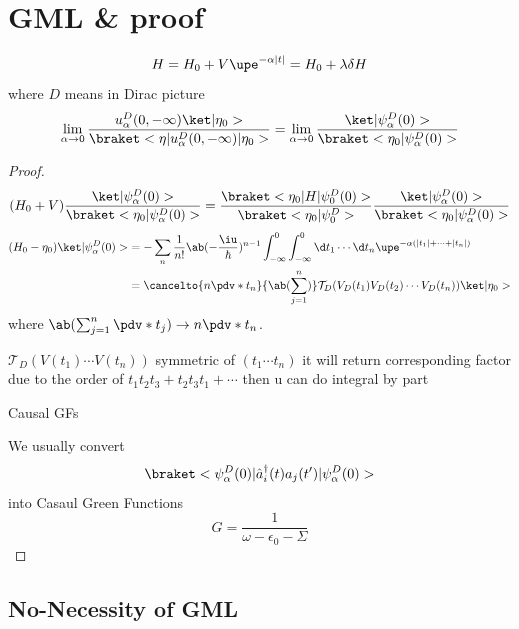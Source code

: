 \section{GML \& proof}

\[
  H = H_0 + V\upe^{-\alpha|t|} = H_0 + \lambda\delta H
\]
where $D$ means in Dirac picture
\[
  \lim_{\alpha\to0}
  \frac{u_\alpha^D(0,-\infty) \ket|\eta_0>}{\braket<\eta|u_\alpha^D(0,-\infty)|\eta_0>} = \lim_{\alpha\to0} \frac{\ket|\psi_\alpha^D(0)>}{\braket<\eta_0|\psi_\alpha^D(0)>}
\]
\begin{proof}
  \[
    (H_0 + V) \frac{\ket|\psi_\alpha^D(0)>}{\braket<\eta_0|\psi_\alpha^D(0)>}
= \frac{\braket<\eta_0|H|\psi_0^D(0)>}{\braket<\eta_0|\psi_0^D>}
    \frac{\ket|\psi_\alpha^D(0)>}{\braket<\eta_0|\psi_\alpha^D(0)>}
  \]
\begin{align*}
  (H_0 - \eta_0)\ket|\psi_\alpha^D(0)>
& = -\sum_n \frac1{n!} \ab(-\frac\iu\hbar)^{n-1} \int_{-\infty}^0 \int_{-\infty}^0
  \d t_1 \cdots \d t_n \upe^{-\alpha(|t_1| + \cdots + |t_n|)}\\
& = \cancelto{n\pdv*{}{t_n}}{\ab(\sum_{j=1}^n)} \mathcal T_D (V_D(t_1) V_D(t_2) \cdots V_D(t_n)) \ket|\eta_0>
\end{align*}
  where $\ab(\sum_{j=1}^n \pdv*{}{t_j}) \to n\pdv*{}{t_n}$.
  \begin{center}
  \end{center}
  $\mathcal T_D(V(t_1) \cdots V(t_n))$
  symmetric of $(t_1 \cdots t_n)$
  it will return corresponding factor due to the order of $t_1t_2t_3 + t_2t_3t_1 + \cdots$
  then u can do integral by part

  Causal GFs

  We usually convert
  \[
    \braket<\psi_\alpha^D(0)|\hat a_i^\dagger(t) a_j(t')|\psi_\alpha^D(0)>
  \]
  into Casaul Green Functions
  \[
    G = \frac1{\omega - \epsilon_0 - \Sigma}
  \]
\end{proof}

\subsection{No-Necessity of GML}

